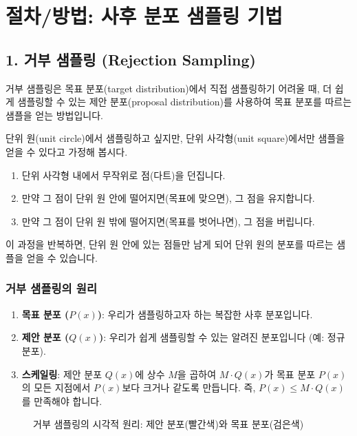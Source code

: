 \documentclass[11pt,a4paper]{book}
\providecommand{\newsection}{\section}
\theoremstyle{definition}
\begin{document}
\newsection{절차/방법: 사후 분포 샘플링 기법}

\subsection*{1. 거부 샘플링 (Rejection Sampling)}
거부 샘플링은 목표 분포(target distribution)에서 직접 샘플링하기 어려울 때, 더 쉽게 샘플링할 수 있는 제안 분포(proposal distribution)를 사용하여 목표 분포를 따르는 샘플을 얻는 방법입니다.

\begin{examplebox}[title=거부 샘플링 비유: 다트 던지기]
단위 원(unit circle)에서 샘플링하고 싶지만, 단위 사각형(unit square)에서만 샘플을 얻을 수 있다고 가정해 봅시다.
\begin{enumerate}
    \item 단위 사각형 내에서 무작위로 점(다트)을 던집니다.
    \item 만약 그 점이 단위 원 안에 떨어지면(목표에 맞으면), 그 점을 유지합니다.
    \item 만약 그 점이 단위 원 밖에 떨어지면(목표를 벗어나면), 그 점을 버립니다.
\end{enumerate}
이 과정을 반복하면, 단위 원 안에 있는 점들만 남게 되어 단위 원의 분포를 따르는 샘플을 얻을 수 있습니다.
\end{examplebox}

\subsubsection*{거부 샘플링의 원리}
\begin{enumerate}
    \item \textbf{목표 분포 ($P(x)$)}: 우리가 샘플링하고자 하는 복잡한 사후 분포입니다.
    \item \textbf{제안 분포 ($Q(x)$)}: 우리가 쉽게 샘플링할 수 있는 알려진 분포입니다 (예: 정규 분포).
    \item \textbf{스케일링}: 제안 분포 $Q(x)$에 상수 $M$을 곱하여 $M \cdot Q(x)$가 목표 분포 $P(x)$의 모든 지점에서 $P(x)$보다 크거나 같도록 만듭니다. 즉, $P(x) \le M \cdot Q(x)$를 만족해야 합니다.
\end{enumerate}

\begin{figure}[h!]
    \centering
    \caption{거부 샘플링의 시각적 원리: 제안 분포(빨간색)와 목표 분포(검은색)}
    \label{fig:rejection_sampling_visual}
\end{figure}
\end{document}
